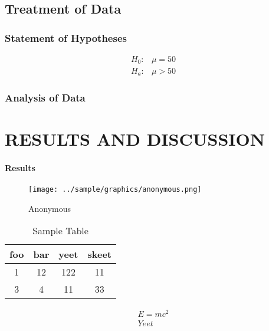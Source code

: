 \documentclass{strrespaper-trad}
\begin{document}
		\subsection{Treatment of Data}
			\subsubsection{Statement of Hypotheses} \vspace{-2em}
				\begin{align*}
					H_0: & \mu = 50 \\
					H_a: & \mu > 50
				\end{align*}
			\subsubsection{Analysis of Data}
				\lipsum[4]

	\section{RESULTS AND DISCUSSION}
		\paragraph{Results}
			\lipsum[13]
			\begin{figure}[ht]
				\centering
				\texttt{[image: ../sample/graphics/anonymous.png]}
				\caption[Anonymous]{Anonymous}
				\label{fig:anonymous}
			\end{figure}

			\lipsum[15]

			\begin{table}[ht]
				\centering
				\caption[Sample Table]{Sample Table}
				\begin{tabular}{cccc}
					\toprule
					foo & bar & yeet & skeet \\
					\midrule
					1   & 12  & 122  & 11    \\
					3   & 4   & 11   & 33    \\
					\bottomrule
				\end{tabular}
				\label{tab:sampletable}
			\end{table}

			\lipsum[14]

			\begin{eqnarray}
				E = mc^2 \label{eq:meeq} \\
				Yeet \label{eq:yeet}
			\end{eqnarray}
\end{document}

